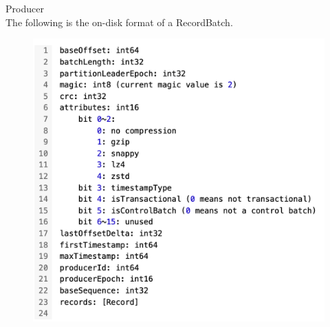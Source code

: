 \begin{frame}[plain,t]{Producer} %
     \\
    \vspace{2ex}
The following is the on-disk format of a RecordBatch.
\vspace{-1ex}
\begin{figure}
    \centering
    \includegraphics[width=0.65\linewidth]{image/0302}
    \label{fig:0302}
\end{figure}
\end{frame}
